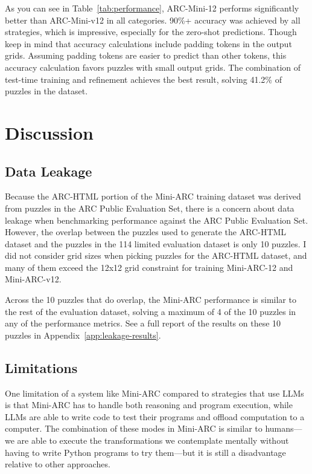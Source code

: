 \documentclass[10pt,twocolumn]{article}
\begin{document}
As you can see in Table~\ref{tab:performance}, ARC-Mini-12 performs
significantly better than ARC-Mini-v12 in all
categories. 90\%+ accuracy was achieved by all strategies, which is
impressive, especially for the zero-shot predictions. Though keep in
mind that accuracy calculations include padding tokens in the output
grids. Assuming padding tokens are easier to predict than other
tokens, this accuracy calculation favors puzzles with small output
grids. The combination of test-time training and refinement achieves
the best result, solving 41.2\% of puzzles in the dataset.

\section{Discussion}
\subsection{Data Leakage}
Because the ARC-HTML portion of the Mini-ARC training dataset was
derived from puzzles in the ARC Public Evaluation Set, there is a
concern about data leakage when benchmarking
performance against the ARC Public Evaluation Set. However, the
overlap between the puzzles used to generate the ARC-HTML dataset and
the puzzles in the 114 limited evaluation dataset is only 10 puzzles.
I did not consider grid sizes when picking puzzles for the
ARC-HTML dataset, and many of them exceed the 12x12 grid constraint
for training Mini-ARC-12 and Mini-ARC-v12.

Across the 10 puzzles that do overlap, the Mini-ARC performance is
similar to the rest
of the evaluation dataset, solving a maximum of 4 of the 10 puzzles
in any of the performance metrics. See a full report of the results
on these 10 puzzles in Appendix~\ref{app:leakage-results}.

\subsection{Limitations}
One limitation of a system like Mini-ARC compared to
strategies that use LLMs is that Mini-ARC has to handle both
reasoning and program execution, while LLMs are able to write code to
test their programs and offload computation to a computer. The
combination of these modes in Mini-ARC is similar to
humans—we are able to execute the transformations we contemplate
mentally without having to write Python programs to try them—but it
is still a disadvantage relative to other approaches.
\end{document}
